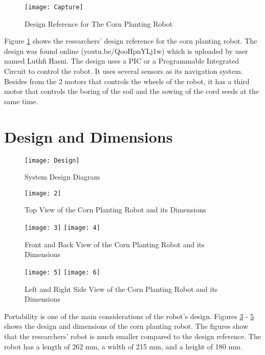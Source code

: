 \begin{figure}[!htbp]
	\centering
		\texttt{[image: Capture]}
	\caption{Design Reference for The Corn Planting Robot}
	\label{fig:reference}
\end{figure}

Figure \ref{fig:reference} shows the researchers’ design reference for the corn planting robot. The design was found online (youtu.be/QooHpnYLj1w) which is uploaded by user named Luthfi Hasni. The design uses a PIC or a Programmable Integrated Circuit to control the robot. It uses several sensors as its navigation system. Besides from the 2 motors that controls the wheels of the robot, it has a third motor that controls the boring of the soil and the sowing of the cord seeds at the same time. 

\section{Design and Dimensions}

\begin{figure}[!htbp]
	\centering
		\texttt{[image: Design]}
	\caption{System Design Diagram}
	\label{fig:Design}
\end{figure}

\begin{figure}[!htbp]
	\centering
		\texttt{[image: 2]}
	\caption{Top View of the Corn Planting Robot and its Dimensions}
	\label{fig:1}
\end{figure}

\begin{figure}[!htbp]
	\centering
		\texttt{[image: 3]}
		\texttt{[image: 4]}
	\caption{Front and Back View of the Corn Planting Robot and its Dimensions}
	\label{fig:2}
\end{figure}

\begin{figure}[!htbp]
	\centering
		\texttt{[image: 5]}
		\texttt{[image: 6]}
	\caption{Left and Right Side View of the Corn Planting Robot and its Dimensions}
	\label{fig:3}
\end{figure}

Portability is one of the main considerations of the robot’s design. Figures \ref{fig:1} - \ref{fig:3} shows the design and dimensions of the corn planting robot. The figures show that the researchers’ robot is much smaller compared to the design reference. The robot has a length of 262 mm, a width of 215 mm, and a height of 180 mm.

